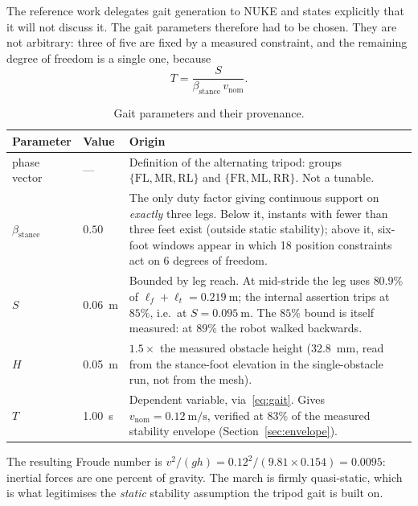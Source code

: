 \documentclass[11pt,a4paper]{article}
\begin{document}
The reference work delegates gait generation to NUKE and states explicitly
that it will not discuss it. The gait parameters therefore had to be chosen.
They are not arbitrary: three of five are fixed by a measured constraint, and
the remaining degree of freedom is a single one, because
\begin{equation}
T = \frac{S}{\beta_{\mathrm{stance}}\, v_{\mathrm{nom}}} .
\label{eq:gait}
\end{equation}

\begin{table}[htbp]
\centering
\caption{Gait parameters and their provenance.}
\label{tab:gait}
\small
\begin{tabular}{@{}llp{78mm}@{}}
\toprule
\textbf{Parameter} & \textbf{Value} & \textbf{Origin} \\
\midrule
phase vector & --- &
  Definition of the alternating tripod: groups
  $\{\mathrm{FL,MR,RL}\}$ and $\{\mathrm{FR,ML,RR}\}$. Not a tunable. \\
$\beta_{\mathrm{stance}}$ & $0.50$ &
  The only duty factor giving continuous support on \emph{exactly} three legs.
  Below it, instants with fewer than three feet exist (outside static
  stability); above it, six-foot windows appear in which 18 position
  constraints act on 6 degrees of freedom. \\
$S$ & \SI{0.06}{\meter} &
  Bounded by leg reach. At mid-stride the leg uses $80.9\%$ of
  $\ell_f+\ell_t=\SI{0.219}{\meter}$; the internal assertion trips at $85\%$,
  i.e.\ at $S=\SI{0.095}{\meter}$. The $85\%$ bound is itself measured: at
  $89\%$ the robot walked backwards. \\
$H$ & \SI{0.05}{\meter} &
  $1.5\times$ the measured obstacle height (\SI{32.8}{\milli\meter}, read from
  the stance-foot elevation in the single-obstacle run, not from the mesh). \\
$T$ & \SI{1.00}{\second} &
  Dependent variable, via~\eqref{eq:gait}. Gives
  $v_{\mathrm{nom}}=\SI{0.12}{\meter\per\second}$, verified at $83\%$ of the
  measured stability envelope (Section~\ref{sec:envelope}). \\
\bottomrule
\end{tabular}
\end{table}

The resulting Froude number is
$v^2/(g h) = 0.12^2/(9.81\times 0.154) = 0.0095$: inertial forces are one
percent of gravity. The march is firmly quasi-static, which is what legitimises
the \emph{static} stability assumption the tripod gait is built on.
\end{document}
